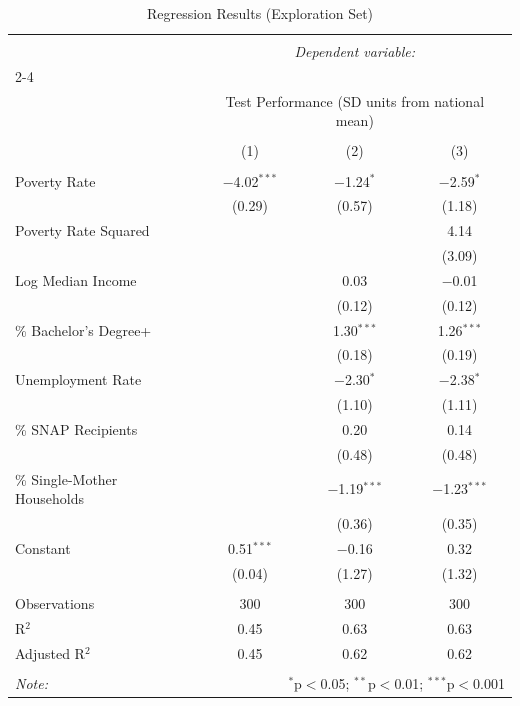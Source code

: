 \documentclass[
]{article}
\begin{document}
\begin{table}[!htbp] \centering 
  \caption{Regression Results (Exploration Set)} 
  \label{} 
\small 
\begin{tabular}{@{\extracolsep{5pt}}lccc} 
\\[-1.8ex]\hline 
\hline \\[-1.8ex] 
 & \multicolumn{3}{c}{\textit{Dependent variable:}} \\ 
\cline{2-4} 
\\[-1.8ex] & \multicolumn{3}{c}{Test Performance (SD units from national mean)} \\ 
\\[-1.8ex] & (1) & (2) & (3)\\ 
\hline \\[-1.8ex] 
 Poverty Rate & $-$4.02$^{***}$ & $-$1.24$^{*}$ & $-$2.59$^{*}$ \\ 
  & (0.29) & (0.57) & (1.18) \\ 
  Poverty Rate Squared &  &  & 4.14 \\ 
  &  &  & (3.09) \\ 
  Log Median Income &  & 0.03 & $-$0.01 \\ 
  &  & (0.12) & (0.12) \\ 
  \% Bachelor's Degree+ &  & 1.30$^{***}$ & 1.26$^{***}$ \\ 
  &  & (0.18) & (0.19) \\ 
  Unemployment Rate &  & $-$2.30$^{*}$ & $-$2.38$^{*}$ \\ 
  &  & (1.10) & (1.11) \\ 
  \% SNAP Recipients &  & 0.20 & 0.14 \\ 
  &  & (0.48) & (0.48) \\ 
  \% Single-Mother Households &  & $-$1.19$^{***}$ & $-$1.23$^{***}$ \\ 
  &  & (0.36) & (0.35) \\ 
  Constant & 0.51$^{***}$ & $-$0.16 & 0.32 \\ 
  & (0.04) & (1.27) & (1.32) \\ 
 \hline \\[-1.8ex] 
Observations & 300 & 300 & 300 \\ 
R$^{2}$ & 0.45 & 0.63 & 0.63 \\ 
Adjusted R$^{2}$ & 0.45 & 0.62 & 0.62 \\ 
\hline 
\hline \\[-1.8ex] 
\textit{Note:}  & \multicolumn{3}{r}{$^{*}$p$<$0.05; $^{**}$p$<$0.01; $^{***}$p$<$0.001} \\ 
\end{tabular} 
\end{table}
\end{document}
